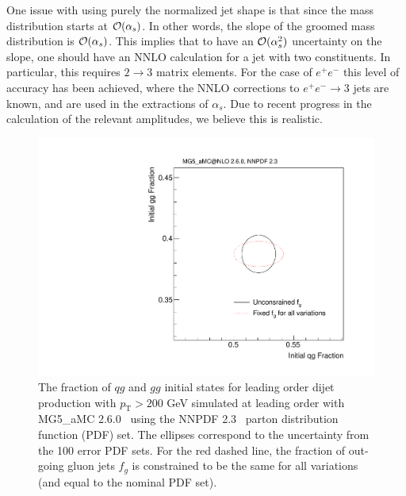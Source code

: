 One issue with using purely the normalized jet shape is that since the mass distribution starts at ${\mathcal O}(\alpha_s)$. In other words, the slope of the groomed mass distribution is ${\mathcal O}(\alpha_s)$. This implies that to have an ${\mathcal O}(\alpha_s^2)$ uncertainty on the slope, one should have an NNLO calculation for a jet with two constituents.  In particular, this requires $2\to 3$ matrix elements. For the case of $e^+e^-$ this level of accuracy has been achieved, where the NNLO corrections to $e^+e^-\to 3$ jets are known, and are used in the extractions of $\alpha_s$. Due to recent progress in the calculation of the relevant amplitudes, we believe this is realistic.



\begin{figure}[h!]
\begin{center}
\includegraphics[width = 0.5\columnwidth]{figures/PDFs.pdf}
\end{center}
\caption{The fraction of $qg$ and $gg$ initial states for leading
  order dijet production with $p_\text{T}>200$ GeV simulated at leading order with MG5\_aMC 2.6.0~\cite{Alwall:2014hca}
  using the NNPDF 2.3~\cite{Ball:2012cx} parton distribution function
  (PDF) set.  The ellipses correspond to the uncertainty from the 100
  error PDF sets.  For the red dashed line, the fraction of out-going
  gluon jets $f_g$ is constrained to be the same for all variations
  (and equal to the nominal PDF set).}
\label{fig:pdf}
\end{figure}





























